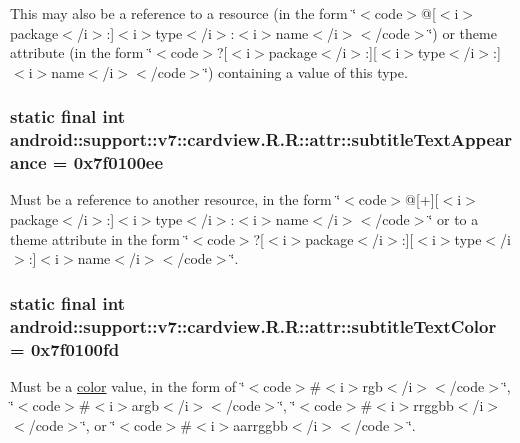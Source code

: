 This may also be a reference to a resource (in the form \char`\"{}$<$code$>$@\mbox{[}$<$i$>$package$<$/i$>$:\mbox{]}$<$i$>$type$<$/i$>$:$<$i$>$name$<$/i$>$$<$/code$>$\char`\"{}) or theme attribute (in the form \char`\"{}$<$code$>$?\mbox{[}$<$i$>$package$<$/i$>$:\mbox{]}\mbox{[}$<$i$>$type$<$/i$>$:\mbox{]}$<$i$>$name$<$/i$>$$<$/code$>$\char`\"{}) containing a value of this type. \hypertarget{classandroid_1_1support_1_1v7_1_1cardview_1_1_r_1_1attr_fec22ebe6e73301aa9fedf931401d461}{
\subsubsection[{subtitleTextAppearance}]{\setlength{\rightskip}{0pt plus 5cm}static final int android::support::v7::cardview.R.R::attr::subtitleTextAppearance = 0x7f0100ee}}
\label{classandroid_1_1support_1_1v7_1_1cardview_1_1_r_1_1attr_fec22ebe6e73301aa9fedf931401d461}


Must be a reference to another resource, in the form \char`\"{}$<$code$>$@\mbox{[}+\mbox{]}\mbox{[}$<$i$>$package$<$/i$>$:\mbox{]}$<$i$>$type$<$/i$>$:$<$i$>$name$<$/i$>$$<$/code$>$\char`\"{} or to a theme attribute in the form \char`\"{}$<$code$>$?\mbox{[}$<$i$>$package$<$/i$>$:\mbox{]}\mbox{[}$<$i$>$type$<$/i$>$:\mbox{]}$<$i$>$name$<$/i$>$$<$/code$>$\char`\"{}. \hypertarget{classandroid_1_1support_1_1v7_1_1cardview_1_1_r_1_1attr_25c9d04040be06af760befedc0d16da9}{
\subsubsection[{subtitleTextColor}]{\setlength{\rightskip}{0pt plus 5cm}static final int android::support::v7::cardview.R.R::attr::subtitleTextColor = 0x7f0100fd}}
\label{classandroid_1_1support_1_1v7_1_1cardview_1_1_r_1_1attr_25c9d04040be06af760befedc0d16da9}


Must be a \hyperlink{classandroid_1_1support_1_1v7_1_1cardview_1_1_r_1_1color}{color} value, in the form of \char`\"{}$<$code$>$\#$<$i$>$rgb$<$/i$>$$<$/code$>$\char`\"{}, \char`\"{}$<$code$>$\#$<$i$>$argb$<$/i$>$$<$/code$>$\char`\"{}, \char`\"{}$<$code$>$\#$<$i$>$rrggbb$<$/i$>$$<$/code$>$\char`\"{}, or \char`\"{}$<$code$>$\#$<$i$>$aarrggbb$<$/i$>$$<$/code$>$\char`\"{}. 

